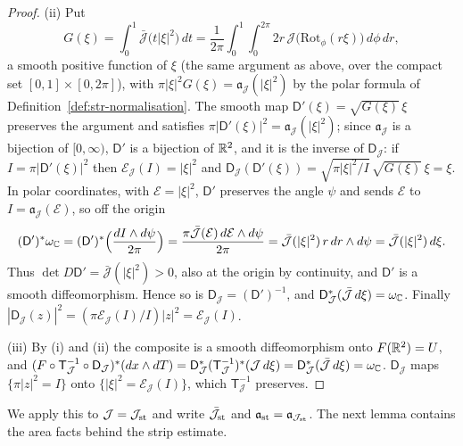 \begin{proof}
(ii) Put
\[
 G(\xi)=\int_0^1\bar{\mathcal J}\big(t|\xi|^2\big)\,dt
 =\frac1{2\pi}\int_0^1\!\!\int_0^{2\pi}2r\,\mathcal J\big(\mathrm{Rot}_\phi(r\xi)\big)\,d\phi\,dr ,
\]
a smooth positive function of $\xi$ (the same argument as above, over the compact set $[0,1]\times[0,2\pi]$), with
$\pi|\xi|^2G(\xi)=\mathfrak a_{\mathcal J}(|\xi|^2)$ by the polar formula of Definition~\ref{def:str-normalisation}. The smooth map
$\mathsf D'(\xi)=\sqrt{G(\xi)}\,\xi$ preserves the argument and satisfies $\pi|\mathsf D'(\xi)|^2=\mathfrak a_{\mathcal J}(|\xi|^2)$;
since $\mathfrak a_{\mathcal J}$ is a bijection of $[0,\infty)$, $\mathsf D'$ is a bijection of $\mathbb{R}^2$, and it is the inverse of
$\mathsf D_{\mathcal J}$: if $I=\pi|\mathsf D'(\xi)|^2$ then $\mathcal E_{\mathcal J}(I)=|\xi|^2$ and
$\mathsf D_{\mathcal J}(\mathsf D'(\xi))=\sqrt{\pi|\xi|^2/I}\,\sqrt{G(\xi)}\,\xi=\xi$. In polar coordinates, with
$\mathcal E=|\xi|^2$, $\mathsf D'$ preserves the angle $\psi$ and sends $\mathcal E$ to $I=\mathfrak a_{\mathcal J}(\mathcal E)$, so off
the origin
\[
 (\mathsf D')^*\omega_{\mathbb{C}}=(\mathsf D')^*\Big(\frac{dI\wedge d\psi}{2\pi}\Big)
 =\frac{\pi\bar{\mathcal J}(\mathcal E)\,d\mathcal E\wedge d\psi}{2\pi}
 =\bar{\mathcal J}(|\xi|^2)\,r\,dr\wedge d\psi=\bar{\mathcal J}(|\xi|^2)\,d\xi .
\]
Thus $\det D\mathsf D'=\bar{\mathcal J}(|\xi|^2)>0$, also at the origin by continuity, and $\mathsf D'$ is a smooth
diffeomorphism. Hence so is $\mathsf D_{\mathcal J}=(\mathsf D')^{-1}$, and
$\mathsf D_{\mathcal J}^*(\bar{\mathcal J}\,d\xi)=\omega_{\mathbb{C}}$. Finally
$|\mathsf D_{\mathcal J}(z)|^2=(\pi\mathcal E_{\mathcal J}(I)/I)|z|^2=\mathcal E_{\mathcal J}(I)$.

(iii) By (i) and (ii) the composite is a smooth diffeomorphism onto $F(\mathbb{R}^2)=U$, and
$(F\circ\mathsf T_{\mathcal J}^{-1}\circ\mathsf D_{\mathcal J})^*(dx\wedge dT)
=\mathsf D_{\mathcal J}^*(\mathsf T_{\mathcal J}^{-1})^*(\mathcal J\,d\xi)=\mathsf D_{\mathcal J}^*(\bar{\mathcal J}\,d\xi)=\omega_{\mathbb{C}}$.
$\mathsf D_{\mathcal J}$ maps $\{\pi|z|^2=I\}$ onto $\{|\xi|^2=\mathcal E_{\mathcal J}(I)\}$, which $\mathsf T_{\mathcal J}^{-1}$
preserves.
\end{proof}

We apply this to $\mathcal J=\mathcal J_{\rm st}$ and write $\bar{\mathcal J}_{\rm st}$ and
$\mathfrak a_{\rm st}=\mathfrak a_{\mathcal J_{\rm st}}$. The next lemma contains the area facts behind the strip estimate.

